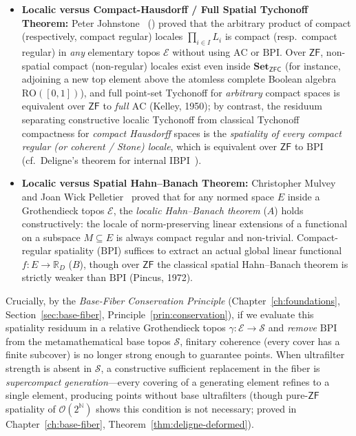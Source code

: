 \begin{itemize}

  \item \textbf{Localic versus Compact-Hausdorff / Full Spatial Tychonoff Theorem:} Peter Johnstone~\cite{Johnstone81} (\cite[Ch.~III, \S 1]{Johnstone82}) proved that the arbitrary product of compact (respectively, compact regular) locales $\prod_{i \in I} L_i$ is compact (resp.\ compact regular) in \emph{any} elementary topos $\mathcal{E}$ without using $\mathrm{AC}$ or $\mathrm{BPI}$. Over $\mathsf{ZF}$, non-spatial compact (non-regular) locales exist even inside $\mathbf{Set}_{\mathsf{ZFC}}$ (for instance, adjoining a new top element above the atomless complete Boolean algebra $\mathrm{RO}([0, 1])$), and full point-set Tychonoff for \emph{arbitrary} compact spaces is equivalent over $\mathsf{ZF}$ to \emph{full $\mathrm{AC}$} (Kelley, 1950); by contrast, the residuum separating constructive localic Tychonoff from classical Tychonoff compactness for \emph{compact Hausdorff} spaces is the \emph{spatiality of every compact regular (or coherent / Stone) locale}, which is equivalent over $\mathsf{ZF}$ to $\mathrm{BPI}$~\cite[III.1.10]{Johnstone82} (cf.\ Deligne's theorem for internal $\mathrm{IBPI}$~\cite[Exp.~VI, Appendice]{Deligne72}).

  \item \textbf{Localic versus Spatial Hahn--Banach Theorem:} Christopher Mulvey and Joan Wick Pelletier~\cite{MulveyPelletier91} proved that for any normed space $E$ inside a Grothendieck topos $\mathcal{E}$, the \emph{localic Hahn--Banach theorem} ($A$) holds constructively: the locale of norm-preserving linear extensions of a functional on a subspace $M \subseteq E$ is always compact regular and non-trivial. Compact-regular spatiality ($\mathrm{BPI}$) suffices to extract an actual global linear functional $f: E \to \mathbb{R}_D$ ($B$), though over $\mathsf{ZF}$ the classical spatial Hahn--Banach theorem is strictly weaker than $\mathrm{BPI}$ (Pincus, 1972).

\end{itemize}

Crucially, by the \emph{Base-Fiber Conservation Principle} (Chapter~\ref{ch:foundations}, Section~\ref{sec:base-fiber}, Principle~\ref{prin:conservation}), if we evaluate this spatiality residuum in a relative Grothendieck topos $\gamma: \mathcal{E} \to \mathcal{S}$ and \emph{remove} $\mathrm{BPI}$ from the metamathematical base topos $\mathcal{S}$, finitary coherence (every cover has a finite subcover) is no longer strong enough to guarantee points. When ultrafilter strength is absent in $\mathcal{S}$, a constructive sufficient replacement in the fiber is \emph{supercompact generation}---every covering of a generating element refines to a single element, producing points without base ultrafilters (though pure-$\mathsf{ZF}$ spatiality of $\mathcal{O}(2^{\mathbb{N}})$ shows this condition is not necessary; proved in Chapter~\ref{ch:base-fiber}, Theorem~\ref{thm:deligne-deformed}).

